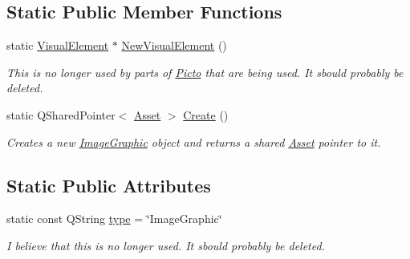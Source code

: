 \subsection*{Static Public Member Functions}
\begin{DoxyCompactItemize}
\item 
\hypertarget{class_picto_1_1_image_graphic_ae879b2af81ad35b1400d20614c467df7}{static \hyperlink{struct_picto_1_1_visual_element}{Visual\-Element} $\ast$ \hyperlink{class_picto_1_1_image_graphic_ae879b2af81ad35b1400d20614c467df7}{New\-Visual\-Element} ()}\label{class_picto_1_1_image_graphic_ae879b2af81ad35b1400d20614c467df7}

\begin{DoxyCompactList}\small\item\em This is no longer used by parts of \hyperlink{namespace_picto}{Picto} that are being used. It sbould probably be deleted. \end{DoxyCompactList}\item 
\hypertarget{class_picto_1_1_image_graphic_a899c0e8df055e2c75ee3355cafb5ce14}{static Q\-Shared\-Pointer$<$ \hyperlink{class_picto_1_1_asset}{Asset} $>$ \hyperlink{class_picto_1_1_image_graphic_a899c0e8df055e2c75ee3355cafb5ce14}{Create} ()}\label{class_picto_1_1_image_graphic_a899c0e8df055e2c75ee3355cafb5ce14}

\begin{DoxyCompactList}\small\item\em Creates a new \hyperlink{class_picto_1_1_image_graphic}{Image\-Graphic} object and returns a shared \hyperlink{class_picto_1_1_asset}{Asset} pointer to it. \end{DoxyCompactList}\end{DoxyCompactItemize}
\subsection*{Static Public Attributes}
\begin{DoxyCompactItemize}
\item 
\hypertarget{class_picto_1_1_image_graphic_a04f4bdaef31dfa777aae4a9a0ea11e89}{static const Q\-String \hyperlink{class_picto_1_1_image_graphic_a04f4bdaef31dfa777aae4a9a0ea11e89}{type} = \char`\"{}Image\-Graphic\char`\"{}}\label{class_picto_1_1_image_graphic_a04f4bdaef31dfa777aae4a9a0ea11e89}

\begin{DoxyCompactList}\small\item\em I believe that this is no longer used. It sbould probably be deleted. \end{DoxyCompactList}\end{DoxyCompactItemize}
